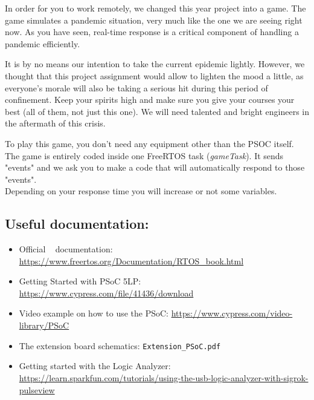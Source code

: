 In order  for you to work remotely, we changed this year project into a game. The game simulates a pandemic situation, very much like the one we are seeing right now. As you have seen, real-time response is a critical component of handling a pandemic efficiently. 

It is by no means our intention to take the current epidemic lightly. However, we thought that this project assignment would allow to lighten the mood a little, as everyone's morale will also be taking a serious hit during this period of confinement. Keep your spirits high and make sure you give your courses your best (all of them, not just this one). We will need talented and bright engineers in the aftermath of this crisis.  

To play this game, you don't need any equipment other than the PSOC itself.
The game is entirely coded inside one FreeRTOS task (\textit{gameTask}).
It sends "events" and we ask you to make a code that will automatically respond to those "events".\\
Depending on your response time you will increase or not some variables.

\subsection*{Useful documentation:}
\begin{itemize}
    \item Official \rtos~ documentation: \url{https://www.freertos.org/Documentation/RTOS_book.html}
    \item Getting Started with PSoC 5LP: \url{https://www.cypress.com/file/41436/download}
    \item Video example on how to use the PSoC: \url{https://www.cypress.com/video-library/PSoC}
    \item The extension board schematics: \texttt{Extension\_PSoC.pdf}
		\item Getting started with the Logic Analyzer: \url{https://learn.sparkfun.com/tutorials/using-the-usb-logic-analyzer-with-sigrok-pulseview}
\end{itemize}

